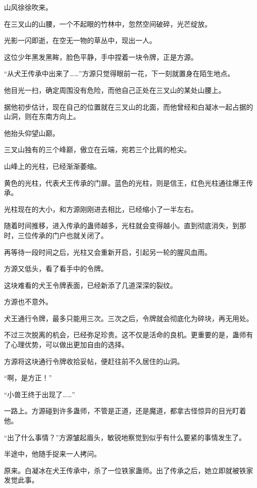 
\begin{this_body}

山风徐徐吹来。

在三叉山的山腰，一个不起眼的竹林中，忽然空间破碎，光芒绽放。

光影一闪即逝，在空无一物的草丛中，现出一人。

这位少年黑发黑眸，脸色平静，手中捏着一块令牌，正是方源。

“从犬王传承中出来了……”方源只觉得眼前一花，下一刻就置身在陌生地点。

他目光一扫，确定周围没有危险，而他自己正处在三叉山的某处山腰上。

据他初步估计，现在自己的位置就在三叉山的北面，而他曾经和白凝冰一起占据的山洞，则在东南方向上。

他抬头仰望山巅。

三叉山独有的三个峰巅，傲立在云端，宛若三个比肩的枪尖。

山峰上的光柱，已经渐渐萎缩。

黄色的光柱，代表犬王传承的门扉。蓝色的光柱，则是信王，红色光柱通往爆王传承。

光柱现在的大小，和方源刚刚进去相比，已经缩小了一半左右。

随着时间推移，进入传承的蛊师越多，光柱就会变得越小。直到彻底消失，到那时，三位传承的门户也就关闭了。

再等待一段时间之后，光柱又会重新开启，引起另一轮的腥风血雨。

方源又低头，看了看手中的令牌。

这块难看的犬王令牌表面，已经新添了几道深深的裂纹。

方源也不意外。

犬王通行令牌，最多只能用三次。三次之后，令牌就会彻底化为碎块，再无用处。

不过三次脱离的机会，已经弥足珍贵。这不仅是活命的良机。更重要的是，蛊师有了心理优势，可以做出更加自由的选择。

方源将这块通行令牌收拾妥帖，便赶往前不久居住的山洞。

“啊，是方正！”

“小兽王终于出现了……”

一路上。方源碰到许多蛊师，不管是正道，还是魔道，都拿古怪惊异的目光盯着他。

“出了什么事情？”方源皱起眉头，敏锐地察觉到似乎有什么要紧的事情发生了。

半途中，他随手捉来一人拷问。

原来。白凝冰在犬王传承中，杀了一位铁家蛊师。出了传承之后，她立即就被铁家发觉此事。


\end{this_body}
